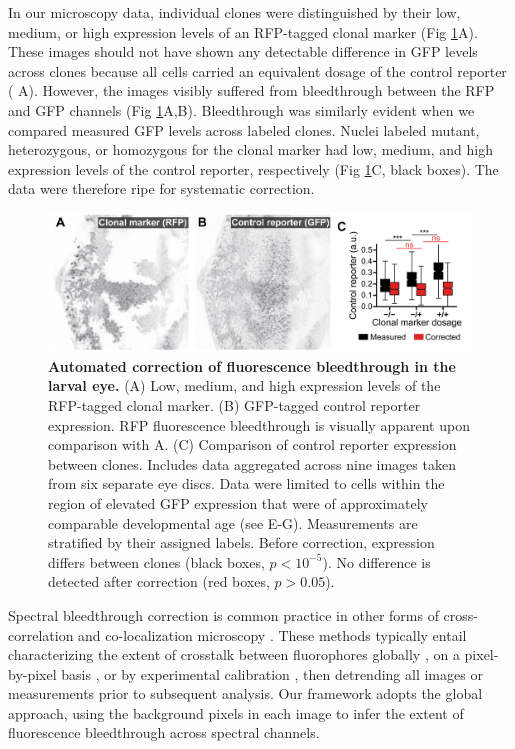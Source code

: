 \documentclass[10pt,letterpaper]{article}
\begin{document}
In our microscopy data, individual clones were distinguished by their low, medium, or high expression levels of an RFP-tagged clonal marker (Fig \ref{fig3}A). These images should not have shown any detectable difference in GFP levels across clones because all cells carried an equivalent dosage of the control reporter ( A). However, the images visibly suffered from bleedthrough between the RFP and GFP channels (Fig \ref{fig3}A,B). Bleedthrough was similarly evident when we compared measured GFP levels across labeled clones. Nuclei labeled mutant, heterozygous, or homozygous for the clonal marker had low, medium, and high expression levels of the control reporter, respectively (Fig \ref{fig3}C, black boxes). The data were therefore ripe for systematic correction.

\begin{figure}[t]
\centering
\includegraphics[scale=1.0]{./figure_3}
\caption{\textbf{Automated correction of fluorescence bleedthrough in the larval eye.}
(A) Low, medium, and high expression levels of the RFP-tagged clonal marker. (B) GFP-tagged control reporter expression. RFP fluorescence bleedthrough is visually apparent upon comparison with A. (C) Comparison of control reporter expression between clones. Includes data aggregated across nine images taken from six separate eye discs. Data were limited to cells within the region of elevated GFP expression that were of approximately comparable developmental age (see  E-G). Measurements are stratified by their assigned labels. Before correction, expression differs between clones (black boxes, $p<10^{-5}$). No difference is detected after correction (red boxes, $p>0.05$).}
\label{fig3}
\end{figure}

Spectral bleedthrough correction is common practice in other forms of cross-correlation and co-localization microscopy \cite{Bacia2012,Zinchuk2007}. These methods typically entail characterizing the extent of crosstalk between fluorophores globally \cite{Arsenovic2017,Kim2013}, on a pixel-by-pixel basis \cite{Elangovan2003}, or by experimental calibration \cite{Bacia2012}, then detrending all images or measurements prior to subsequent analysis. Our framework adopts the global approach, using the background pixels in each image to infer the extent of fluorescence bleedthrough across spectral channels.
\end{document}
